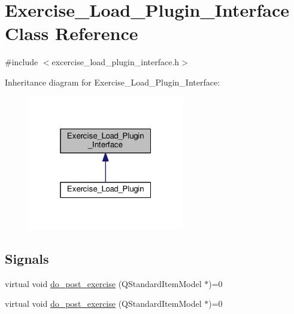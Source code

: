 \hypertarget{classExercise__Load__Plugin__Interface}{}\section{Exercise\+\_\+\+Load\+\_\+\+Plugin\+\_\+\+Interface Class Reference}
\label{classExercise__Load__Plugin__Interface}


{\ttfamily \#include $<$excercise\+\_\+load\+\_\+plugin\+\_\+interface.\+h$>$}



Inheritance diagram for Exercise\+\_\+\+Load\+\_\+\+Plugin\+\_\+\+Interface\+:\nopagebreak
\begin{figure}[H]
\begin{center}
\leavevmode
\includegraphics[width=193pt]{classExercise__Load__Plugin__Interface__inherit__graph}
\end{center}
\end{figure}
\subsection*{Signals}
\begin{DoxyCompactItemize}
\item 
virtual void \hyperlink{classExercise__Load__Plugin__Interface_a1672d1247efd8051607500adb4547ea1}{do\+\_\+post\+\_\+exercise} (Q\+Standard\+Item\+Model $\ast$)=0
\item 
virtual void \hyperlink{classExercise__Load__Plugin__Interface_a1672d1247efd8051607500adb4547ea1}{do\+\_\+post\+\_\+exercise} (Q\+Standard\+Item\+Model $\ast$)=0
\end{DoxyCompactItemize}

